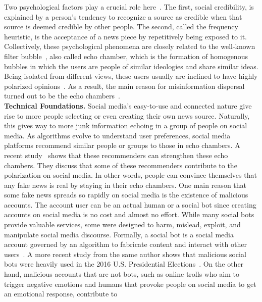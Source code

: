 Two psychological factors play a crucial role here~\parencite{TheRussianFirehoseOfFalsehood_Paul}. The first, social credibility, is explained
by a person’s tendency to recognize a source as credible when that source is deemed credible by other people. The second, called the frequency heuristic, is the acceptance of a news piece by repetitively being exposed to it. Collectively, these psychological phenomena are closely related to the well-known filter bubble~\parencite{TheFilterBubble_Pariser}, also called echo chamber, which is the formation of homogenous bubbles in which the users are people of similar ideologies and share similar ideas. Being isolated from different views, these users usually are inclined to have highly polarized opinions~\parencite{EchoChambers_Sunstein}. As a result, the main reason for misinformation dispersal turned out to be the echo
chambers~\parencite{TheSpreadingOfMisinformationOnline_DelVicario}.\\
\textbf{Technical Foundations.} Social media's easy-to-use and connected nature give rise to more people selecting or even creating their own news source. Naturally, this gives way to more junk information echoing in a group of people on social media. As algorithms evolve to understand user preferences, social media platforms recommend similar people or groups to those in echo chambers. A recent study~\parencite{TheEffectOfPeopleRecommenderOnEchoChambers_Cinus}  shows that these recommenders can strengthen these echo chambers. They discuss that some of these recommenders contribute to the polarization on social media. In other words, people can convince themselves that any fake news is real by staying in their echo chambers. One main reason that some fake news spreads so rapidly on social media is the existence of malicious accounts. The account user can be an actual human or a social bot since creating accounts on social media is no cost and almost no effort. While many social bots provide valuable services, some were designed to harm, mislead, exploit, and manipulate social media discourse. Formally, a social bot is a social media account governed by an algorithm to fabricate content and interact with other users~\parencite{TheRiseOfSocialBots_Ferrara}. A more recent study from the same author shows that malicious social bots were heavily used in the 2016 U.S. Presidential
Elections~\parencite{SocialBotsDistortThe2016USPresidentialElection_Bessi}. On the other hand, malicious accounts that are not bots, such as
online trolls who aim to trigger negative emotions and humans that provoke people on social media to get an emotional response, contribute to
